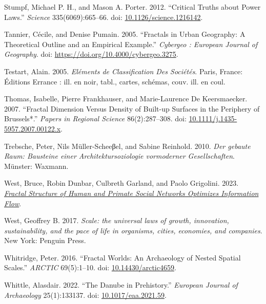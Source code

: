 \documentclass[
  12pt,
]{book}
\newlength{\cslhangindent}
\newlength{\cslentryspacingunit} %
\newenvironment{CSLReferences}[2] %
 {%
  \setlength{\parindent}{0pt}
  \ifodd #1
  \let\oldpar\par
  \def\par{\hangindent=\cslhangindent\oldpar}
  \fi
  \setlength{\parskip}{#2\cslentryspacingunit}
 }%
 {}
\begin{document}
\begin{CSLReferences}{1}{0}
\leavevmode{}%
Stumpf, Michael P. H., and Mason A. Porter. 2012. {``Critical Truths about Power Laws.''} \emph{Science} 335(6069):665--66. doi: \href{https://doi.org/10.1126/science.1216142}{10.1126/science.1216142}.

\leavevmode{}%
Tannier, Cécile, and Denise Pumain. 2005. {``Fractals in Urban Geography: A Theoretical Outline and an Empirical Example.''} \emph{Cybergeo : European Journal of Geography}. doi: \url{https://doi.org/10.4000/cybergeo.3275}.

\leavevmode{}%
Testart, Alain. 2005. \emph{Eléments de Classification Des Sociétés}. Paris, France: Éditions Errance : ill. en noir, tabl., cartes, schémas, couv. ill. en coul.

\leavevmode{}%
Thomas, Isabelle, Pierre Frankhauser, and Marie-Laurence De Keersmaecker. 2007. {``Fractal Dimension Versus Density of Built-up Surfaces in the Periphery of Brussels*.''} \emph{Papers in Regional Science} 86(2):287--308. doi: \href{https://doi.org/10.1111/j.1435-5957.2007.00122.x}{10.1111/j.1435-5957.2007.00122.x}.

\leavevmode{}%
Trebsche, Peter, Nils Müller-Scheeβel, and Sabine Reinhold. 2010. \emph{Der gebaute Raum: Bausteine einer Architektursoziologie vormoderner Gesellschaften}. Münster: Waxmann.

\leavevmode{}%
West, Bruce, Robin Dunbar, Culbreth Garland, and Paolo Grigolini. 2023. \emph{\href{https://doi.org/10.1101/2023.02.23.529431}{Fractal Structure of Human and Primate Social Networks Optimizes Information Flow}}.

\leavevmode{}%
West, Geoffrey B. 2017. \emph{Scale: the universal laws of growth, innovation, sustainability, and the pace of life in organisms, cities, economies, and companies}. New York: Penguin Press.

\leavevmode{}%
Whitridge, Peter. 2016. {``Fractal Worlds: An Archaeology of Nested Spatial Scales.''} \emph{ARCTIC} 69(5):1--10. doi: \href{https://doi.org/10.14430/arctic4659}{10.14430/arctic4659}.

\leavevmode{}%
Whittle, Alasdair. 2022. {``The Danube in Prehistory.''} \emph{European Journal of Archaeology} 25(1):133137. doi: \href{https://doi.org/10.1017/eaa.2021.59}{10.1017/eaa.2021.59}.


\end{CSLReferences}
\end{document}
